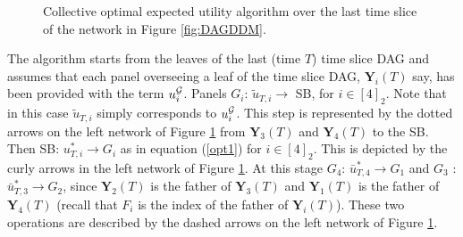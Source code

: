 \begin{example}
\begin{figure}
\centerline{
}
\caption{Collective optimal expected utility algorithm over the last time slice of the network in Figure \ref{fig:DAGDDM}.\label{algofig}}
\end{figure}
The algorithm starts from the leaves of the last (time $T$) time slice DAG and assumes that each panel overseeing a leaf of the time slice DAG, $\bm{Y}_i(T) $ say, has been provided with the term $u_i^{\mathcal{G}}$. Panels $G_i$: $\tilde{u}_{T,i}\longrightarrow$ SB, for $i\in[4]_2$. Note that in this case $\tilde{u}_{T,i}$ simply corresponds to $u_{i}^{\mathcal{G}}$. This step is represented by the dotted arrows on the left network of Figure \ref{algofig} from $\bm{Y}_3(T)$ and $\bm{Y}_4(T)$ to the SB. Then SB: $u^*_{T,i}\longrightarrow G_i$ as in equation (\ref{opt1}) for $i\in[4]_2$. This is depicted by the curly arrows in the left network of Figure \ref{algofig}. At this stage $G_4$: $\bar{u}^*_{T,4}\longrightarrow G_1$ and $G_3$ :$\bar{u}^*_{T,3}\longrightarrow G_2$, since $\bm{Y}_2(T)$ is the father of $\bm{Y}_3(T)$ and $\bm{Y}_1(T)$ is the father of $\bm{Y}_4(T)$ (recall that $F_i$ is the index of the father of $\bm{Y}_i(T)$). These two operations are described by the dashed arrows on the left network of Figure \ref{algofig}. 


\end{example}
